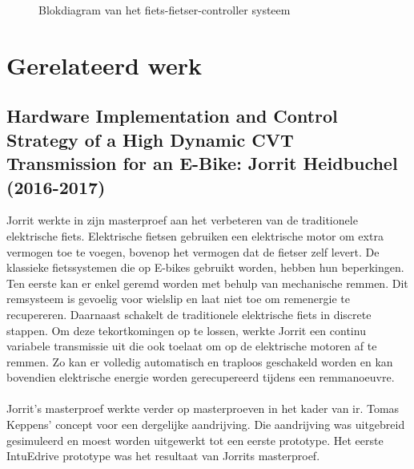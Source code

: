 \begin{figure}[h]
\caption{Blokdiagram van het fiets-fietser-controller systeem}
  \label{fig:Blokdiagram van het fiets-fietser-controller systeem}
\end{figure}
\newpage
\section{Gerelateerd werk}
\subsection{Hardware Implementation and Control Strategy of a High Dynamic CVT Transmission for an E-Bike: Jorrit Heidbuchel (2016-2017)}
Jorrit werkte in zijn masterproef aan het verbeteren van de traditionele elektrische fiets. Elektrische fietsen gebruiken een elektrische motor om extra vermogen toe te voegen, bovenop het vermogen dat de fietser zelf levert. De klassieke fietssystemen die op E-bikes gebruikt worden, hebben hun beperkingen. Ten eerste kan er enkel geremd worden met behulp van mechanische remmen. Dit remsysteem is gevoelig voor wielslip en laat niet toe om remenergie te recupereren.  Daarnaast schakelt de traditionele elektrische fiets in discrete stappen. Om deze tekortkomingen op te lossen, werkte  Jorrit een continu variabele transmissie uit die ook toelaat om op de elektrische motoren af te remmen. Zo kan er volledig automatisch en traploos geschakeld worden en kan bovendien elektrische energie worden gerecupereerd tijdens een remmanoeuvre. 
\\\\
Jorrit’s masterproef werkte verder op masterproeven in het kader van ir. Tomas Keppens’ concept voor een dergelijke aandrijving. Die aandrijving was uitgebreid gesimuleerd en moest worden uitgewerkt tot een eerste prototype. Het eerste IntuEdrive prototype was het resultaat van Jorrits masterproef.


